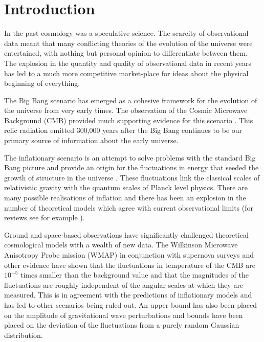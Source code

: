 \renewcommand{\CVSrevision}%
{\version$Id: shortintro.tex,v 1.7 2009/10/19 11:33:25 ith Exp $}

\chapter{Introduction}
\label{ch:shortintro}
In the past cosmology was a speculative science. The scarcity of observational
data meant that many conflicting theories of the evolution of the universe were
entertained, with nothing but personal opinion to differentiate between them.
The explosion in the quantity and quality of observational data in recent years
has led to a much more competitive market-place for ideas about the physical
beginning of everything.

The Big Bang scenario has emerged as a cohesive framework for the evolution of
the universe from very early times. The observation of the Cosmic
Microwave Background (CMB) provided much supporting evidence for this scenario
\cite{book:kolbturner}. This
relic radiation emitted 300,000 years after the Big Bang continues to
be our primary source of information about the early universe.

The inflationary scenario is an attempt to solve problems with the standard Big
Bang picture and provide an origin for the fluctuations in energy that seeded
the growth of structure in the universe
\cite{Starobinsky:1980te,Guth:1980zm,Albrecht:1982wi,Linde:1981mu,
Starobinsky:1982ee}. These fluctuations link the classical scales of
relativistic gravity with the quantum scales of Planck level physics. There are
many possible realisations of inflation and there has been an explosion in the
number of theoretical models which agree with current observational limits
(for reviews see for example \cite{book:liddle, Alabidi:2008ej, Baumann2009}).

Ground and space-based observations have significantly challenged theoretical
cosmological models with a wealth of new data. The Wilkinson Microwave
Anisotropy Probe mission (WMAP) \cite{Komatsu:2008hk} in conjunction with supernova
surveys and other evidence have shown that the fluctuations in
temperature of the CMB are $10^{-5}$ times smaller than the background value
and that the magnitudes of the fluctuations are roughly independent of the
angular scales at which they are measured. This is in agreement with the
predictions of inflationary models and has led to other scenarios being ruled
out. An upper bound has also been placed
on the amplitude of gravitational wave perturbations and bounds have been
placed on the deviation of the fluctuations from a purely random Gaussian
distribution.

